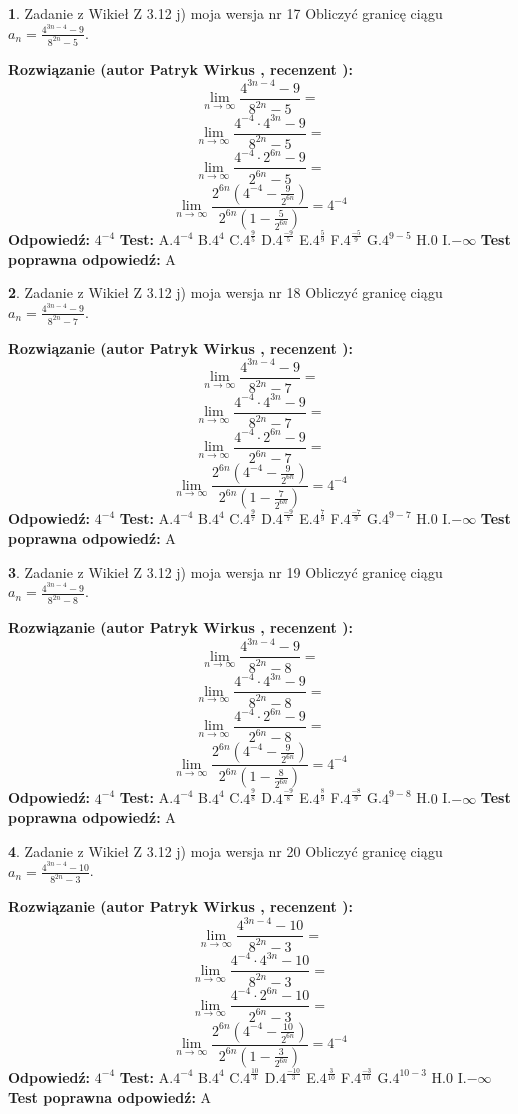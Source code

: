 \documentclass[12pt, a4paper]{article}
\theoremstyle{definition} %
\newtheorem{zad}{}
\newcommand{\zadStart}[1]{\begin{zad}#1\newline}
\newcommand{\zadStop}{\end{zad}}
\newcommand{\rozwStart}[2]{\noindent \textbf{Rozwiązanie (autor #1 , recenzent #2): }\newline}
\newcommand{\rozwStop}{\newline}
\newcommand{\odpStart}{\noindent \textbf{Odpowiedź:}\newline}
\newcommand{\odpStop}{\newline}
\newcommand{\testStart}{\noindent \textbf{Test:}\newline}
\newcommand{\testStop}{\newline}
\newcommand{\kluczStart}{\noindent \textbf{Test poprawna odpowiedź:}\newline}
\newcommand{\kluczStop}{\newline}
\begin{document}
\zadStart{Zadanie z Wikieł Z 3.12 j) moja wersja nr 17}
Obliczyć granicę ciągu $a_{n}=\frac{4^{3n-4}-9}{8^{2n}-5}$.
\zadStop
\rozwStart{Patryk Wirkus}{}
$$\lim\limits_{n\to\infty}\frac{4^{3n-4}-9}{8^{2n}-5}=$$
$$\lim\limits_{n\to\infty}\frac{4^{-4} \cdot 4^{3n}-9}{8^{2n}-5}=$$
$$\lim\limits_{n\to\infty}\frac{4^{-4} \cdot 2^{6n}-9}{2^{6n}-5}=$$
$$\lim\limits_{n\to\infty}\frac{2^{6n}(4^{-4} - \frac{9}{2^{6n}})}{2^{6n}(1-\frac{5}{2^{6n}})}= 4^{-4}$$
\rozwStop
\odpStart
$4^{-4}$
\odpStop
\testStart
A.$4^{-4}$
B.$4^{4}$
C.$4^{\frac{9}{5}}$
D.$4^{\frac{-9}{5}}$
E.$4^{\frac{5}{9}}$
F.$4^{\frac{-5}{9}}$
G.$4^{9-5}$
H.$0$
I.$-\infty$
\testStop
\kluczStart
A
\kluczStop



\zadStart{Zadanie z Wikieł Z 3.12 j) moja wersja nr 18}
Obliczyć granicę ciągu $a_{n}=\frac{4^{3n-4}-9}{8^{2n}-7}$.
\zadStop
\rozwStart{Patryk Wirkus}{}
$$\lim\limits_{n\to\infty}\frac{4^{3n-4}-9}{8^{2n}-7}=$$
$$\lim\limits_{n\to\infty}\frac{4^{-4} \cdot 4^{3n}-9}{8^{2n}-7}=$$
$$\lim\limits_{n\to\infty}\frac{4^{-4} \cdot 2^{6n}-9}{2^{6n}-7}=$$
$$\lim\limits_{n\to\infty}\frac{2^{6n}(4^{-4} - \frac{9}{2^{6n}})}{2^{6n}(1-\frac{7}{2^{6n}})}= 4^{-4}$$
\rozwStop
\odpStart
$4^{-4}$
\odpStop
\testStart
A.$4^{-4}$
B.$4^{4}$
C.$4^{\frac{9}{7}}$
D.$4^{\frac{-9}{7}}$
E.$4^{\frac{7}{9}}$
F.$4^{\frac{-7}{9}}$
G.$4^{9-7}$
H.$0$
I.$-\infty$
\testStop
\kluczStart
A
\kluczStop



\zadStart{Zadanie z Wikieł Z 3.12 j) moja wersja nr 19}
Obliczyć granicę ciągu $a_{n}=\frac{4^{3n-4}-9}{8^{2n}-8}$.
\zadStop
\rozwStart{Patryk Wirkus}{}
$$\lim\limits_{n\to\infty}\frac{4^{3n-4}-9}{8^{2n}-8}=$$
$$\lim\limits_{n\to\infty}\frac{4^{-4} \cdot 4^{3n}-9}{8^{2n}-8}=$$
$$\lim\limits_{n\to\infty}\frac{4^{-4} \cdot 2^{6n}-9}{2^{6n}-8}=$$
$$\lim\limits_{n\to\infty}\frac{2^{6n}(4^{-4} - \frac{9}{2^{6n}})}{2^{6n}(1-\frac{8}{2^{6n}})}= 4^{-4}$$
\rozwStop
\odpStart
$4^{-4}$
\odpStop
\testStart
A.$4^{-4}$
B.$4^{4}$
C.$4^{\frac{9}{8}}$
D.$4^{\frac{-9}{8}}$
E.$4^{\frac{8}{9}}$
F.$4^{\frac{-8}{9}}$
G.$4^{9-8}$
H.$0$
I.$-\infty$
\testStop
\kluczStart
A
\kluczStop



\zadStart{Zadanie z Wikieł Z 3.12 j) moja wersja nr 20}
Obliczyć granicę ciągu $a_{n}=\frac{4^{3n-4}-10}{8^{2n}-3}$.
\zadStop
\rozwStart{Patryk Wirkus}{}
$$\lim\limits_{n\to\infty}\frac{4^{3n-4}-10}{8^{2n}-3}=$$
$$\lim\limits_{n\to\infty}\frac{4^{-4} \cdot 4^{3n}-10}{8^{2n}-3}=$$
$$\lim\limits_{n\to\infty}\frac{4^{-4} \cdot 2^{6n}-10}{2^{6n}-3}=$$
$$\lim\limits_{n\to\infty}\frac{2^{6n}(4^{-4} - \frac{10}{2^{6n}})}{2^{6n}(1-\frac{3}{2^{6n}})}= 4^{-4}$$
\rozwStop
\odpStart
$4^{-4}$
\odpStop
\testStart
A.$4^{-4}$
B.$4^{4}$
C.$4^{\frac{10}{3}}$
D.$4^{\frac{-10}{3}}$
E.$4^{\frac{3}{10}}$
F.$4^{\frac{-3}{10}}$
G.$4^{10-3}$
H.$0$
I.$-\infty$
\testStop
\kluczStart
A
\kluczStop
\end{document}

